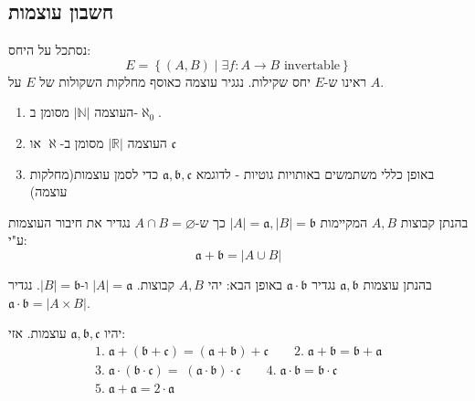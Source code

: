 \documentclass{tstextbook}
\begin{document}
\subsection{חשבון עוצמות}

\begin{definition}
נסתכל על היחס:
$$E=\left\{  (A,B)\mid \exists f:A\to B \text{ invertable}  \right\}$$
ראינו ש-\(E\) יחס שקילות. נגגיר עוצמה כאוסף מחלקות השקולות של \(E\) על \(A\).

\end{definition}
\begin{symbolize}
  \begin{enumerate}
    \item העוצמה \(|\mathbb{N}|\) מסומן ב-\(\aleph_{0}\). 


    \item העוצמה \(|\mathbb{R}|\) מסומן ב-\(\aleph\) או \(\mathfrak{c}\)


    \item באופן כללי משתמשים באותויות גוטיות - לדוגמא \(\mathfrak{a,b,c}\) כדי לסמן עוצמות(מחלקות עוצמה) 


  \end{enumerate}
\end{symbolize}
\begin{definition}
בהנתן קבוצות \(A,B\) המקיימות \(|A|=\mathfrak{a},|B|=\mathfrak{b}\) כך ש-\(A\cap B = \varnothing\) נגדיר את חיבור העוצמות ע"י:
$${\mathfrak{a}}+{\mathfrak{b}}=|A\cup B|$$

\end{definition}
\begin{definition}
בהנתן עוצמות \(\mathfrak{a,b}\) נגדיר \(\mathfrak{a\cdot b}\) באופן הבא:
יהי \(A,B\) קבוצות. \(|A|=\mathfrak{a}\) ו-\(|B|=\mathfrak{b}\). נגדיר \(\mathfrak{a\cdot b}=|A\times B|\).

\end{definition}
\begin{proposition}
יהיו \(\mathfrak{a,b,c}\) עוצמות. אזי:
$$\begin{gather}1.\;\mathfrak{a+(b+c)=(a+b)+c} \qquad 2.\;\mathfrak{a+b=b+a} \\3.\;\mathfrak{a\cdot \left( b\cdot c \right)=\;\left( a\cdot b \right)\cdot c} \qquad 4.\;\mathfrak{a\cdot b=b\cdot c} \\5.\;\mathfrak{a+a}=2\cdot\mathfrak{a}    
\end{gather} $$

\end{proposition}
\end{document}
